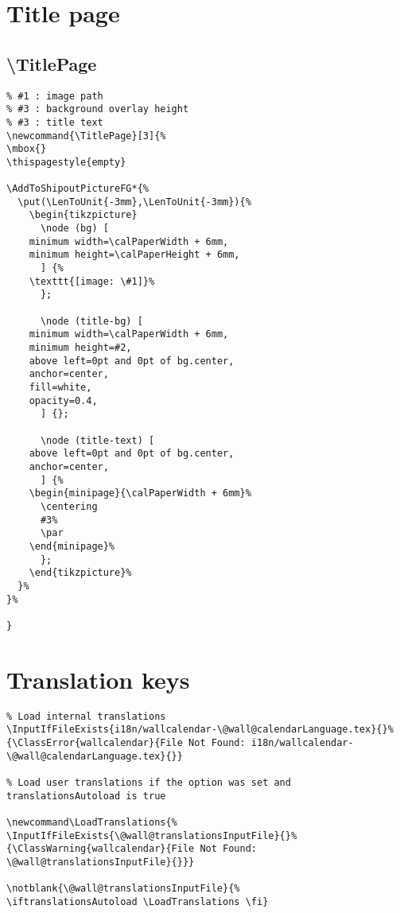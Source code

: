 \documentclass[11pt,oneside]{memoir-article}
\begin{document}
\chapter{Title page}
\label{sec:orgbfe4cc3}

\section{\textbackslash TitlePage}
\label{sec:org783d8ae}

\begin{verbatim}
% #1 : image path
% #3 : background overlay height
% #3 : title text
\newcommand{\TitlePage}[3]{%
\mbox{}
\thispagestyle{empty}

\AddToShipoutPictureFG*{%
  \put(\LenToUnit{-3mm},\LenToUnit{-3mm}){%
    \begin{tikzpicture}
      \node (bg) [
	minimum width=\calPaperWidth + 6mm,
	minimum height=\calPaperHeight + 6mm,
      ] {%
	\texttt{[image: \#1]}%
      };

      \node (title-bg) [
	minimum width=\calPaperWidth + 6mm,
	minimum height=#2,
	above left=0pt and 0pt of bg.center,
	anchor=center,
	fill=white,
	opacity=0.4,
      ] {};

      \node (title-text) [
	above left=0pt and 0pt of bg.center,
	anchor=center,
      ] {%
	\begin{minipage}{\calPaperWidth + 6mm}%
	  \centering
	  #3%
	  \par
	\end{minipage}%
      };
    \end{tikzpicture}%
  }%
}%

}
\end{verbatim}

\chapter{Translation keys}
\label{sec:orgf745c25}

\begin{verbatim}
% Load internal translations
\InputIfFileExists{i18n/wallcalendar-\@wall@calendarLanguage.tex}{}%
{\ClassError{wallcalendar}{File Not Found: i18n/wallcalendar-\@wall@calendarLanguage.tex}{}}

% Load user translations if the option was set and translationsAutoload is true

\newcommand\LoadTranslations{%
\InputIfFileExists{\@wall@translationsInputFile}{}%
{\ClassWarning{wallcalendar}{File Not Found: \@wall@translationsInputFile}{}}}

\notblank{\@wall@translationsInputFile}{%
\iftranslationsAutoload \LoadTranslations \fi}
\end{verbatim}
\end{document}
